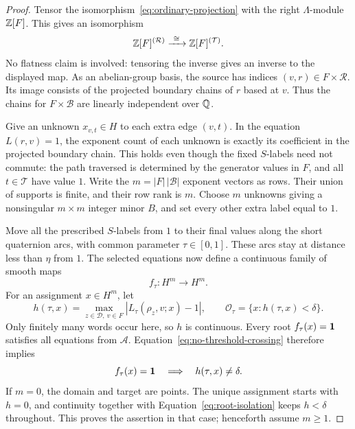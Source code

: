 \begin{proof}
Tensor the isomorphism~\eqref{eq:ordinary-projection} with the right
$\Lambda$-module $\mathbb Z[F]$.  This gives an isomorphism
\begin{equation}\label{eq:quotient-basis}
 \mathbb Z[F]^{(\mathcal R)}\xrightarrow{\ \cong\ }
 \mathbb Z[F]^{(\mathcal T)}.
\end{equation}
No flatness claim is involved: tensoring the inverse gives an inverse
to the displayed map.  As an abelian-group basis, the source has indices
$(v,r)\in F\times\mathcal R$.  Its image consists of the projected
boundary chains of $r$ based at $v$.  Thus the chains for
$F\times\mathcal B$ are linearly independent over $\mathbb Q$.

Give an unknown $x_{v,t}\in H$ to each extra edge $(v,t)$.
In the equation $L(r,v)=1$, the exponent count of each unknown is
exactly its coefficient in the projected boundary chain.  This holds
even though the fixed $S$-labels need not commute: the path traversed
is determined by the generator values in $F$, and all $t\in\mathcal T$
have value $1$.  Write the $m=|F|\,|\mathcal B|$ exponent vectors as
rows.  Their union of supports is finite, and their row rank is $m$.
Choose $m$ unknowns giving a nonsingular $m\times m$ integer minor
$B$, and set every other extra label equal to $1$.

Move all the prescribed $S$-labels from $1$ to their final values
along the short quaternion arcs, with common parameter $\tau\in[0,1]$.
These arcs stay at distance less than $\eta$ from $1$.
The selected equations now define a continuous family of smooth maps
\[
 f_\tau:H^m\longrightarrow H^m.
\]
For an assignment $x\in H^m$, let
\[
 h(\tau,x)=\max_{z\in\mathcal D,\ v\in F}
       |L_\tau(\rho_z,v;x)-1|,
 \qquad \mathcal O_\tau=\{x:h(\tau,x)<\delta\}.
\]
Only finitely many words occur here, so $h$ is continuous.
Every root $f_\tau(x)=\mathbf 1$ satisfies all equations from $\mathcal A$.
Equation~\eqref{eq:no-threshold-crossing} therefore implies
\begin{equation}\label{eq:root-isolation}
 f_\tau(x)=\mathbf 1\quad\Longrightarrow\quad h(\tau,x)\ne\delta.
\end{equation}
If $m=0$, the domain and target are points.  The unique assignment
starts with $h=0$, and continuity together with
Equation~\eqref{eq:root-isolation} keeps $h<\delta$ throughout.
This proves the assertion in that case; henceforth assume $m\ge1$.


\end{proof}
